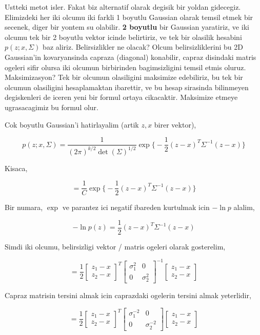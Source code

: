 \documentclass[12pt,fleqn]{article}\usepackage{../common}
\begin{document}
Ustteki metot isler. Fakat biz alternatif olarak degisik bir yoldan
gidecegiz. Elimizdeki her iki olcumu iki farkli 1 boyutlu Gaussian olarak
temsil etmek bir secenek, diger bir yontem su olabilir. \textbf{2 boyutlu}
bir Gaussian yaratiriz, ve iki olcumu tek bir 2 boyutlu vektor icinde
belirtiriz, ve tek bir olasilik hesabini $p(z;x,\Sigma)$ baz aliriz.
Belirsizlikler ne olacak? Olcum belirsizliklerini bu 2D Gaussian'in
kovaryansinda capraza (diagonal) konabilir, capraz disindaki matris ogeleri
sifir olursa iki olcumun birbirinden bagimsizligini temsil etmis
oluruz. Maksimizasyon? Tek bir olcumun olasiligini maksimize edebiliriz, bu
tek bir olcumun olasiligini hesaplamaktan ibarettir, ve bu hesap sirasinda
bilinmeyen degiskenleri de iceren yeni bir formul ortaya
cikacaktir. Maksimize etmeye ugrasacagimiz bu formul olur.

Cok boyutlu Gaussian'i hatirlayalim (artik $z,x$ birer vektor),

$$ p(z;x,\Sigma) = 
\frac{ 1}{(2\pi)^{k/2} \det(\Sigma)^{1/2}} \exp 
\bigg\{ 
-\frac{ 1}{2}(z-x)^T\Sigma^{-1}(z-x)
\bigg\} $$

Kisaca,

$$ =  \frac{ 1}{C} \exp 
\bigg\{ 
-\frac{ 1}{2}(z-x)^T\Sigma^{-1}(z-x)
\bigg\} $$

Bir numara, $\exp$ ve parantez ici negatif ibareden kurtulmak icin
$-\ln p$ alalim,

$$ -\ln p(z) = 
\frac{ 1}{2}(z-x)^T\Sigma^{-1}(z-x)
$$

Simdi iki olcumu, belirsizligi vektor / matris ogeleri olarak gosterelim, 

$$ = \frac{1}{2}  
\left[\begin{array}{c}
z_1-x \\ z_2-x
\end{array}\right]^T
\left[\begin{array}{cc}
\sigma_1^2 & 0 \\
0 & \sigma_2^2 
\end{array}\right]^{-1}
\left[\begin{array}{c}
z_1-x \\ z_2-x
\end{array}\right]
$$

Capraz matrisin tersini almak icin caprazdaki ogelerin tersini almak
yeterlidir,

$$ = \frac{1}{2}  
\left[\begin{array}{c}
z_1-x \\ z_2-x
\end{array}\right]^T
\left[\begin{array}{cc}
\sigma_1^{-2} & 0 \\
0 & \sigma_2^{-2} 
\end{array}\right]
\left[\begin{array}{c}
z_1-x \\ z_2-x
\end{array}\right]
$$
\end{document}
